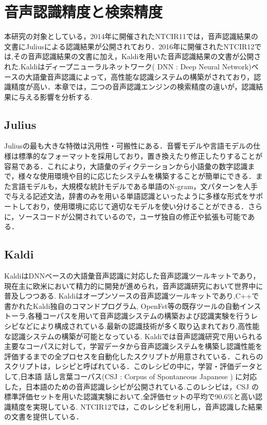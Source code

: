 \chapter{音声認識精度と検索精度}
本研究の対象としている，2014年に開催されたNTCIR11では，音声認識結果の文書にJulius\cite{julius}による認識結果が公開されており．2016年に開催されたNTCIR12では,その音声認識結果の文書に加え，Kaldi\cite{kaldi}を用いた音声認識結果の文書が公開された.Kaldiはディープニューラルネットワーク( DNN : Deep Neural Network)ベースの大語彙音声認識によって，高性能な認識システムの構築がされており，認識精度が高い．本章では，二つの音声認識エンジンの検索精度の違いが，認識結果に与える影響を分析する.


\section{Julius}
Juliusの最も大きな特徴は汎用性・可搬性にある．音響モデルや言語モデルの仕様は標準的なフォーマットを採用しており，置き換えたり修正したりすることが容易である．これにより，大語彙のディクテーションから小語彙の数字認識まで，様々な使用環境や目的に応じたシステムを構築することが簡単にできる．また言語モデルも，大規模な統計モデルである単語のN-gram，文パターンを人手で与える記述文法，辞書のみを用いる単語認識といったように多様な形式をサポートしており，使用環境に応じて適切なモデルを使い分けることができる．さらに，ソースコードが公開されているので，ユーザ独自の修正や拡張も可能である．

\section{Kaldi}
KaldiはDNNベースの大語彙音声認識に対応した音声認識ツールキットであり，現在主に欧米において精力的に開発が進められ，音声認識研究において世界中に普及しつつある. Kaldiはオープンソースの音声認識ツールキットであり,C++で書かれたKaldi独自のコマンドプログラム, OpenFst等の既存ツールの自動インストーラ,各種コーパスを用いて音声認識システムの構築および認識実験を行うレシピなどにより構成されている.最新の認識技術が多く取り込まれており,高性能な認識システムの構築が可能となっている.
Kaldiでは音声認識研究で用いられる主要なコーパスに対して，学習データから音声認識システムを構築し認識性能を評価するまでの全プロセスを自動化したスクリプトが用意されている．これらのスクリプトは，レシピと呼ばれている．このレシピの中に，学習・評価データとして,日本語 話し言葉コーパス(CSJ : Corpus of Spontaneous Japanese ) \cite{csj} に対応した，日本語のための音声認識レシピが公開されている.このレシピは，CSJ の標準評価セットを用いた認識実験において,全評価セットの平均で90.6\%と高い認識精度を実現している. NTCIR12では，このレシピを利用し，音声認識した結果の文書を提供している．


